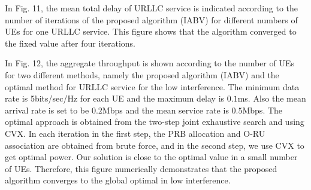 \documentclass[lettersize,journal]{IEEEtran}
\begin{document}
In Fig. 11, the mean total delay of URLLC service is indicated according to the number of iterations of the
proposed algorithm (IABV) for different numbers of UEs for one URLLC service. This figure shows that the algorithm converged to the fixed value after four iterations.

In Fig. 12, the aggregate throughput is shown according to the number of UEs for two different methods, namely the
proposed algorithm (IABV) and the optimal method for URLLC service for the low interference.
The minimum data rate is 5bits/sec/Hz for each UE and the maximum delay is $0.1$ms.
Also the mean arrival rate is set to be $0.2$Mbps and the mean service rate is $0.5$Mbps.
The optimal approach is obtained from the two-step joint exhaustive search and using CVX.
In each iteration in the first step, the PRB allocation and O-RU association are obtained from brute force, and in the second step, we use CVX to get optimal power.
Our solution is close to the optimal value in a small number of UEs.
Therefore, this figure numerically demonstrates that the proposed algorithm converges to the global optimal in low interference.
\end{document}
